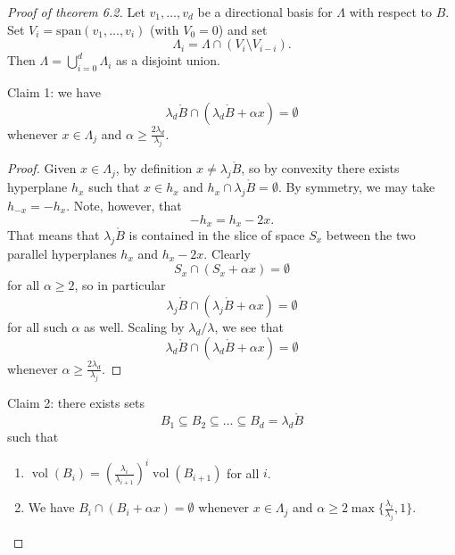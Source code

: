 \documentclass[a4paper]{article}
\begin{document}
\begin{proof}[Proof of theorem 6.2]
  Let \(v_1, \dots, v_d\) be a directional basis for \(\Lambda\) with respect to \(B\). Set \(V_i = \text{span}(v_1, \dots, v_i)\) (with \(V_0 = 0\)) and set
  \[
    \Lambda_i = \Lambda \cap (V_i \setminus V_{i - i}).
  \]
  Then \(\Lambda = \bigcup_{i = 0}^d \Lambda_i\) as a disjoint union.

  Claim 1: we have
  \[
    \lambda_d \ocirc B \cap (\lambda_d \ocirc B + \alpha x) = \emptyset
  \]
  whenever \(x \in \Lambda_j\) and \(\alpha \geq \frac{2\lambda_d}{\lambda_j}\).

  \begin{proof}
    Given \(x \in \Lambda_j\), by definition \(x \neq \lambda_j \ocirc B\), so by convexity there exists hyperplane \(h_x\) such that \(x \in h_x\) and \(h_x \cap \lambda_j \ocirc B = \emptyset\). By symmetry, we may take \(h_{-x} = -h_x\). Note, however, that
    \[
      -h_x = h_x - 2x.
    \]
    That means that \(\lambda_j \ocirc B\) is contained in the slice of space \(S_x\) between the two parallel hyperplanes \(h_x\) and \(h_x - 2x\). Clearly
    \[
      S_x \cap (S_x + \alpha x ) = \emptyset
    \]
    for all \(\alpha \geq 2\), so in particular
    \[
      \lambda_j \ocirc B \cap (\lambda_j \ocirc B + \alpha x) = \emptyset
    \]
    for all such \(\alpha\) as well. Scaling by \(\lambda_d/\lambda\), we see that
    \[
      \lambda_d \ocirc B \cap (\lambda_d \ocirc B + \alpha x) = \emptyset
    \]
    whenever \(\alpha \geq \frac{2\lambda_d}{\lambda_j}\).
  \end{proof}

  Claim 2: there exists sets
  \[
    B_1 \subseteq B_2 \subseteq \dots \subseteq B_d = \lambda_d \ocirc B
  \]
  such that
  \begin{enumerate}
  \item \(\operatorname{vol}(B_i) = \left( \frac{\lambda_i}{\lambda_{i + 1}} \right)^i \operatorname{vol}(B_{i + 1})\) for all \(i\).
  \item We have \(B_i \cap (B_i + \alpha x) = \emptyset\) whenever \(x \in \Lambda_j\) and \(\alpha \geq 2 \max \{ \frac{\lambda_i}{\lambda_j}, 1\}\).
  \end{enumerate}


\end{proof}
\end{document}
